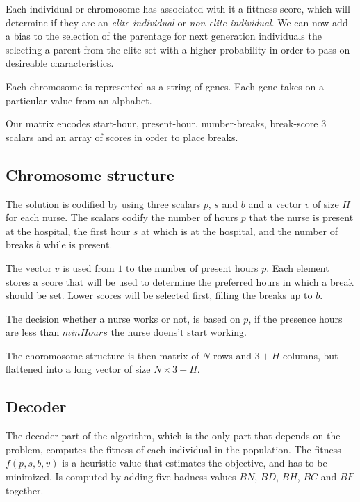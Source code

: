 \documentclass[12pt,a4paper]{article}
\begin{document}
Each individual or chromosome has associated with it a fittness score, which
will determine if they are an \textit{elite individual} or \textit{non-elite
individual}. We can now add a bias to the selection of the parentage for next
generation individuals the selecting a parent from the elite set with a higher
probability in order to pass on desireable characteristics.

Each chromosome is represented as a string of genes. Each gene takes on a
particular value from an alphabet.

Our matrix encodes start-hour, present-hour, number-breaks, break-score
3 scalars and an array of scores in order to place breaks.


\subsection{Chromosome structure}

The solution is codified by using three scalars $p$, $s$ and $b$ and a vector
$v$ of size $H$ for each nurse. The scalars codify the number of hours $p$ that
the nurse is present at the hospital, the first hour $s$ at which is at the
hospital, and the number of breaks $b$ while is present.

The vector $v$ is used from $1$ to the number of present hours $p$. Each element
stores a score that will be used to determine the preferred hours in which a
break should be set. Lower scores will be selected first, filling the breaks up
to $b$.

The decision whether a nurse works or not, is based on $p$, if the presence
hours are less than $minHours$ the nurse doens't start working.

The choromosome structure is then matrix of $N$ rows and $3+H$ columns, but
flattened into a long vector of size $N \times 3+H$.

\subsection{Decoder}

The decoder part of the algorithm, which is the only part that depends on the
problem, computes the fitness of each individual in the population. The fitness
$f(p,s,b,v)$ is a heuristic value that estimates the objective, and has to be
minimized. Is computed by adding five badness values $BN$, $BD$, $BH$, $BC$ and
$BF$ together.
\end{document}
